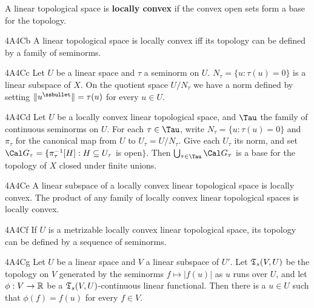  A linear topological space
is {\bf locally convex} if the convex open sets
form a base for the topology.

\spheader 4A4Cb A linear topological space is locally convex iff its
topology can be defined by a family of seminorms.

\spheader 4A4Cc Let $U$ be a linear space and $\tau$ a seminorm on $U$.
 $N_{\tau}=\{u:\tau(u)=0\}$ is a linear subspace of $X$.
On the quotient space $U/N_{\tau}$ we have a norm defined by setting
$\|u^{\ssbullet}\|=\tau(u)$ for every $u\in U$.

\spheader 4A4Cd Let $U$ be a locally convex linear topological space,
and $\Tau$ the family of continuous seminorms on $U$.   For each
$\tau\in\Tau$, write $N_{\tau}=\{u:\tau(u)=0\}$ and $\pi_{\tau}$ for the canonical map from
$U$ to $U_{\tau}=U/N_{\tau}$.   Give each $U_{\tau}$ its norm, and set
$\Cal G_{\tau}=\{\pi_{\tau}^{-1}[H]:H\subseteq U_{\tau}$ is open$\}$.
Then $\bigcup_{\tau\in\Tau}\Cal G_{\tau}$ is a base for the topology of
$X$ closed under finite
unions.

\spheader 4A4Ce A linear subspace of a locally convex linear topological
space is locally convex.     The product of any family of
locally convex linear topological
spaces is locally convex.

\spheader 4A4Cf If $U$ is a metrizable locally convex linear topological
space, its topology can be defined by a sequence of seminorms.

\spheader 4A4Cg Let $U$ be a linear space and $V$ a linear subspace
of $U'$.
Let $\frak T_s(V,U)$ be the topology on $V$ generated by the
seminorms $f\mapsto|f(u)|$ as $u$ runs over $U$, and let $\phi:V\to\Bbb R$ be a $\frak T_s(V,U)$-continuous
linear functional.   Then there is a $u\in U$ such that $\phi(f)=f(u)$
for every $f\in V$.

